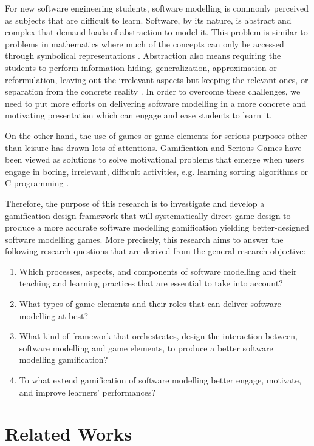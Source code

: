 \documentclass[runningheads,a4paper]{llncs}
\begin{document}
For new software engineering students, software modelling is commonly perceived as subjects that are difficult to learn. Software, by its nature, is abstract and complex that demand loads of abstraction to model it. This problem is similar to problems in mathematics where much of the concepts can only be accessed through symbolical representations \cite{Duval2006}. Abstraction also means requiring the students to perform information hiding, generalization, approximation or reformulation, leaving out the irrelevant aspects but keeping the relevant ones, or separation from the concrete reality \cite{Saitta2013}. In order to overcome these challenges, we need to put more efforts on delivering software modelling in a more concrete and motivating presentation which can engage and ease students to learn it.

On the other hand, the use of games or game elements for serious purposes other than leisure has drawn lots of attentions. Gamification \cite{deterding2011game} and Serious Games \cite{Michael2005} have been viewed as solutions to solve motivational problems that emerge when users engage in  boring, irrelevant, difficult activities, e.g. learning sorting algorithms \cite{Yohannis2015} or C-programming \cite{Ibanez2014}.

Therefore, the purpose of this research is to investigate and develop a gamification design framework that will systematically direct game design to produce a more accurate software modelling gamification yielding better-designed software modelling games. More precisely, this research aims to answer the following research questions that are derived from the general research objective:
\begin{enumerate}
\item Which processes, aspects, and components of software modelling and their teaching and learning practices that are essential to take into account?
\item What types of game elements and their roles that can deliver software modelling at best? 
\item What kind of framework that orchestrates, design the interaction between, software modelling and game elements, to produce a better software modelling gamification?
\item To what extend gamification of software modelling better engage, motivate, and improve learners’ performances?
\end{enumerate}

\section{Related Works}
\end{document}
